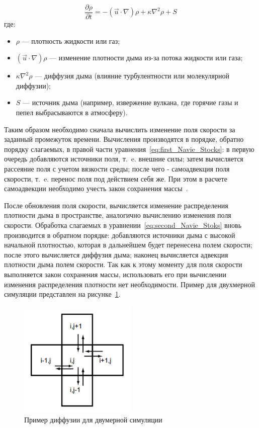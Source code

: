 \begin{equation}
	\label{eq:second_Navie_Stoks}
	\frac{\partial \rho}{\partial t} = -(\vec{u} \cdot \nabla) \rho + \kappa \nabla^2 \rho + S
\end{equation}
где:
\begin{itemize}
	\item \(\rho\) --- плотность жидкости или газ;
	\item \((\vec{u} \cdot \nabla) \rho\) --- изменение плотности дыма из-за потока жидкости или газа;
	\item \(\kappa \nabla^2 \rho\) --- диффузия дыма (влияние турбулентности или молекулярной диффузии);
	\item \(S\) --- источник дыма (например, извержение вулкана, где горячие газы и пепел выбрасываются в атмосферу).
\end{itemize}

Таким образом необходимо сначала вычислить изменение поля скорости за заданный промежуток времени. Вычисления производятся в порядке, обратно порядку слагаемых, в правой части уравнения~\ref{eq:first_Navie_Stocks}: в первую очередь добавляются источники поля, т.~e. внешние силы; затем вычисляется рассеяние поля с учетом вязкости среды; после чего - самоадвекция поля скорости, т.~e. перенос поля под действием себя же. При этом в расчете самоадвекции необходимо учесть закон сохранения массы~\cite{stam}.

После обновления поля скорости, вычисляется изменение распределения плотности дыма в пространстве, аналогично вычислению изменения поля скорости. Обработка слагаемых в уравнении~\ref{eq:second_Navie_Stoks} вновь производится в обратном порядке: добавляются источники дыма с высокой начальной плотностью, которая в дальнейшем будет перенесена полем скорости; после этого вычисляется диффузия дыма; наконец вычисляется адвекция плотности дыма полем скорости. Так как к этому моменту для поля скорости выполняется закон сохранения массы, использовать его при вычислении изменения распределения плотности нет необходимости. Пример для двухмерной симуляции представлен на рисунке~\ref{fig:diffusion}.


\begin{figure}[H]
	\centering
	\includegraphics[width=0.5\textwidth, page=1]{assets/img/diffusion.png}   
	\caption{Пример диффузии для двумерной симуляции}
	\label{fig:diffusion}
\end{figure}

